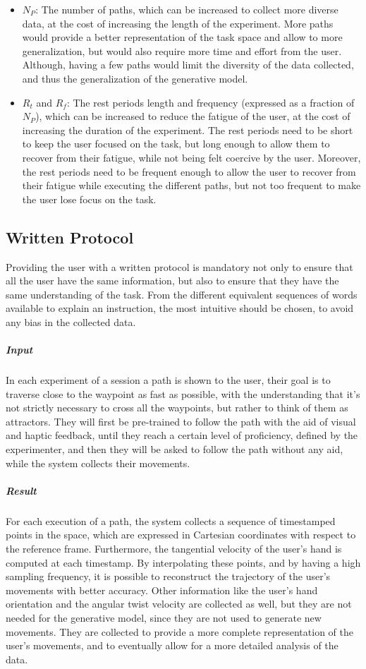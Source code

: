 \documentclass[12pt]{report}
\begin{document}
\begin{itemize}
    \item $N_P$: The number of paths, which can be increased to collect more diverse data, at the cost of increasing the length of the experiment. More paths would provide a better representation of the task space and allow to more generalization, but would also require more time and effort from the user. Although, having a few paths would limit the diversity of the data collected, and thus the generalization of the generative model.
    \item $R_t$ and $R_f$: The rest periods length and frequency (expressed as a fraction of $N_P$), which can be increased to reduce the fatigue of the user, at the cost of increasing the duration of the experiment. The rest periods need to be short to keep the user focused on the task, but long enough to allow them to recover from their fatigue, while not being felt coercive by the user. Moreover, the rest periods need to be frequent enough to allow the user to recover from their fatigue while executing the different paths, but not too frequent to make the user lose focus on the task. 
\end{itemize}
\subsection{Written Protocol}
Providing the user with a written protocol is mandatory not only to ensure that all the user have the same information, but also to ensure that they have the same understanding of the task. From the different equivalent sequences of words available to explain an instruction, the most intuitive should be chosen, to avoid any bias in the collected data. 
\subparagraph{Input} In each experiment of a session a path is shown to the user, their goal is to traverse close to the waypoint as fast as possible, with the understanding that it's not strictly necessary to cross all the waypoints, but rather to think of them as attractors. They will first be pre-trained to follow the path with the aid of visual and haptic feedback, until they reach a certain level of proficiency, defined by the experimenter, and then they will be asked to follow the path without any aid, while the system collects their movements.
\subparagraph{Result} For each execution of a path, the system collects a sequence of timestamped points in the space, which are expressed in Cartesian coordinates with respect to the reference frame. Furthermore, the tangential velocity of the user's hand is computed at each timestamp. By interpolating these points, and by having a high sampling frequency, it is possible to reconstruct the trajectory of the user's movements with better accuracy. Other information like the user's hand orientation and the angular twist velocity are collected as well, but they are not needed for the generative model, since they are not used to generate new movements. They are collected to provide a more complete representation of the user's movements, and to eventually allow for a more detailed analysis of the data.
\end{document}
